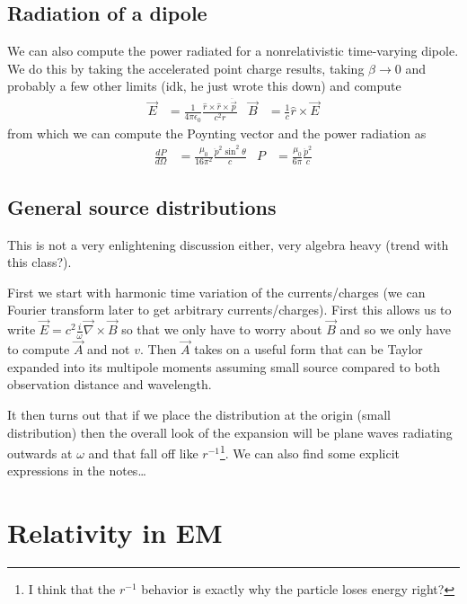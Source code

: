\documentclass[10pt,twocolumn]{article}
\newcommand{\rd}[2]{\frac{d#1}{d#2}}
\begin{document}
\subsection{Radiation of a dipole}
We can also compute the power radiated for a nonrelativistic time-varying dipole. We do this by taking the accelerated point charge results, taking $\beta \to 0$ and probably a few other limits (idk, he just wrote this down) and compute
\begin{align}
    \vec{E} &= \frac{1}{4\pi\epsilon_0}\frac{\hat{r} \times \hat{r} \times \ddot{\vec{p}}}{c^2r} & \vec{B} &= \frac{1}{c}\hat{r} \times \vec{E}
\end{align}
from which we can compute the Poynting vector and the power radiation as
\begin{align}
    \rd{P}{\Omega} &= \frac{\mu_0}{16\pi^2}\frac{\ddot{p}^2\sin^2\theta}{c} & P &= \frac{\mu_0}{6\pi}\frac{\ddot{p}^2}{c}
\end{align}

\subsection{General source distributions}

This is not a very enlightening discussion either, very algebra heavy (trend with this class?).

First we start with harmonic time variation of the currents/charges (we can Fourier transform later to get arbitrary currents/charges). First this allows us to write $\vec{E} = c^2 \frac{i}{\omega}\vec{\nabla} \times \vec{B}$ so that we only have to worry about $\vec{B}$ and so we only have to compute $\vec{A}$ and not $v$. Then $\vec{A}$ takes on a useful form that can be Taylor expanded into its multipole moments assuming small source compared to both observation distance and wavelength.

It then turns out that if we place the distribution at the origin (small distribution) then the overall look of the expansion will be plane waves radiating outwards at $\omega$ and that fall off like $r^{-1}$\footnote{I think that the $r^{-1}$ behavior is exactly why the particle loses energy right?}. We can also find some explicit expressions in the notes\dots

\section{Relativity in EM}
\end{document}
